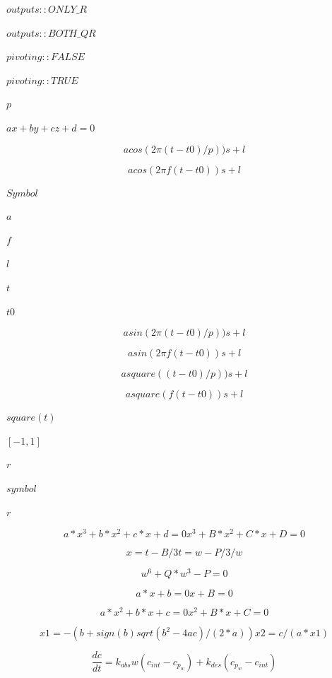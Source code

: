 \documentclass{article}
\begin{document}
$        outputs::ONLY\_R     $
\pagebreak

$        outputs::BOTH\_QR    $
\pagebreak

$        pivoting::FALSE     $
\pagebreak

$        pivoting::TRUE      $
\pagebreak

$        p $
\pagebreak

$ ax + by + cz + d = 0 $
\pagebreak

\[
        a cos(2 \pi (t - t0) / p)) s + l
    \]
\pagebreak

\[
        a cos(2 \pi f (t - t0)) s + l
    \]
\pagebreak

$        Symbol  $
\pagebreak

$        a       $
\pagebreak

$        f       $
\pagebreak

$        l       $
\pagebreak

$        t       $
\pagebreak

$        t0      $
\pagebreak

\[
        a sin(2 \pi (t - t0) / p)) s + l
    \]
\pagebreak

\[
        a sin(2 \pi f (t - t0)) s + l
    \]
\pagebreak

\[
    a square((t - t0) / p)) s + l
\]
\pagebreak

\[
    a square(f (t - t0)) s + l
\]
\pagebreak

$ square(t) $
\pagebreak

$ [-1, 1] $
\pagebreak

$ r $
\pagebreak

$        symbol  $
\pagebreak

$        r       $
\pagebreak

\[
    a*x^3 + b*x^2 + c*x + d = 0
      x^3 + B*x^2 + C*x + D = 0
\]
\pagebreak

\[
    x = t - B/3
    t = w - P/3/w
\]
\pagebreak

\[
    w^6 + Q*w^3 - P = 0
\]
\pagebreak

\[
    a*x + b = 0
      x + B = 0
\]
\pagebreak

\[
    a*x^2 + b*x + c = 0
      x^2 + B*x + C = 0
\]
\pagebreak

\[
    x1 = - (b + sign(b) sqrt(b^2 - 4ac)/(2*a))

    x2 = c/(a*x1)
\]
\pagebreak

\[
    \frac{d c}{d t} =
        k_{abs} w (c_{int} - c_{p_{w}}) + k_{des} (c_{p_{w}} - c_{int})
\]
\pagebreak
\end{document}
